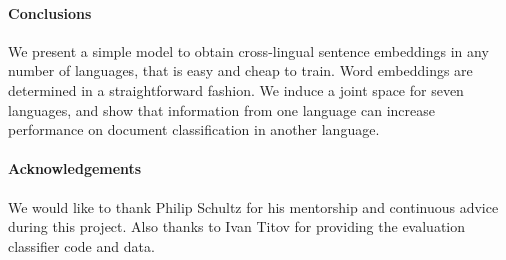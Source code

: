 \documentclass[a4paper,11pt]{article}
\begin{document}




\paragraph{Conclusions}


We present a simple model to obtain cross-lingual sentence embeddings in any number of languages, that is easy and cheap to train. Word embeddings are determined in a straightforward fashion. 
We induce a joint space for seven languages, and show that information from one language can increase performance on document classification in another language. 







\paragraph{Acknowledgements}

We would like to thank Philip Schultz for his mentorship and continuous advice during this project.
Also thanks to Ivan Titov for providing the evaluation classifier code and data.






\end{document}
